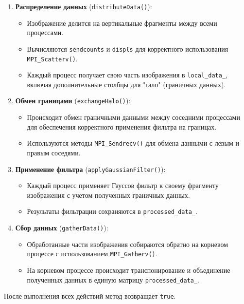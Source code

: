 \documentclass[12pt]{article}
\begin{document}
\begin{enumerate}
    \item \textbf{Распределение данных} (\texttt{distributeData()}):
    \begin{itemize}
        \item Изображение делится на вертикальные фрагменты между всеми процессами.
        \item Вычисляются \texttt{sendcounts} и \texttt{displs} для корректного использования \texttt{MPI\_Scatterv()}.
        \item Каждый процесс получает свою часть изображения в \texttt{local\_data\_}, включая дополнительные столбцы для "гало" (граничных данных).
    \end{itemize}
    
    \item \textbf{Обмен границами} (\texttt{exchangeHalo()}):
    \begin{itemize}
        \item Происходит обмен граничными данными между соседними процессами для обеспечения корректного применения фильтра на границах.
        \item Используются методы \texttt{MPI\_Sendrecv()} для обмена данными с левым и правым соседями.
    \end{itemize}
    
    \item \textbf{Применение фильтра} (\texttt{applyGaussianFilter()}):
    \begin{itemize}
        \item Каждый процесс применяет Гауссов фильтр к своему фрагменту изображения с учетом полученных граничных данных.
        \item Результаты фильтрации сохраняются в \texttt{processed\_data\_}.
    \end{itemize}
    
    \item \textbf{Сбор данных} (\texttt{gatherData()}):
    \begin{itemize}
        \item Обработанные части изображения собираются обратно на корневом процессе с использованием \texttt{MPI\_Gatherv()}.
        \item На корневом процессе происходит транспонирование и объединение полученных данных в единую матрицу \texttt{processed\_data\_}.
    \end{itemize}
\end{enumerate}
После выполнения всех действий метод возвращает \texttt{true}.
\end{document}

